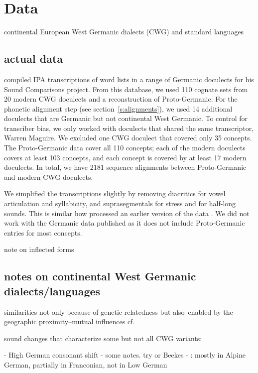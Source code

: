 \documentclass[a4paper]{article}
\begin{document}
\section{Data}

continental European West Germanic dialects (CWG) and standard languages

\subsection{actual data}

\citet{heggarty2018sound} compiled IPA transcriptions of word lists in a range of Germanic doculects for his Sound Comparisons project.
From this database, we used 110 cognate sets from 20 modern CWG doculects and a reconstruction of Proto-Germanic.
For the phonetic alignment step (see section~\ref{s:alignments}), we used 14 additional doculects that are Germanic but not continental West Germanic. 
To control for transciber bias, we only worked with doculects that shared the same transcriptor, Warren Maguire.
We excluded one CWG doculect that covered only 35 concepts. %
The Proto-Germanic data cover all 110 concepts; each of the modern doculects covers at least 103 concepts, and each concept is covered by at least 17 modern doculects.
In total, we have 2181 sequence alignments between Proto-Germanic and modern CWG doculects.

We simplified the transcriptions slightly by removing diacritics for vowel articulation and syllabicity, and suprasegmentals for stress and for half-long sounds.
This is similar how \citet{list2014benchmark} processed an earlier version of the data \citep{renfrew2009languages}.
We did not work with the Germanic data \citeauthor{list2014benchmark} published as it does not include Proto-Germanic entries for most concepts.

note on inflected forms

\subsection{notes on continental West Germanic dialects/languages}

similarities not only because of genetic relatedness but also--enabled by the geographic proximity--mutual influences
cf. \citet[p. 8]{harbert2007germanic}


sound changes that characterize some but not all CWG variants:

- High German consonant shift
  - some notes. try \citet[pp. 47-48]{harbert2007germanic} or Beekes
  - \citet[p. 15]{harbert2007germanic}: mostly in Alpine German, partially in Franconian, not in Low German
\end{document}
